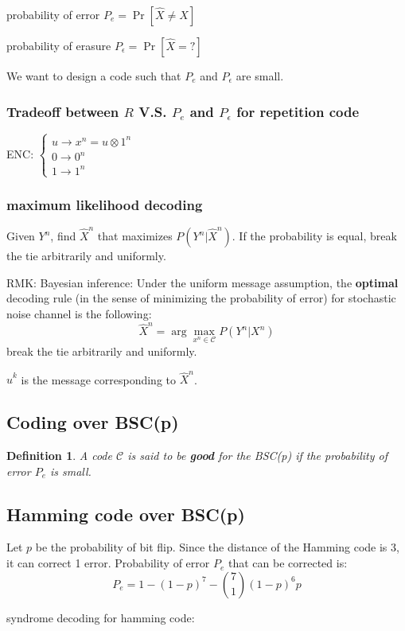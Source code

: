 \documentclass[letterpaper,12pt]{article}
\newtheorem{definition}{Definition}
\begin{document}
probability of error $P_e = \Pr[\hat{X}\neq X]$

probability of erasure $P_{\epsilon} = \Pr[\hat{X}=?]$

We want to design a code such that $P_e$ and $P_{\epsilon}$ are small.

\subsubsection{Tradeoff between $R$ V.S. $P_e$ and $P_{\epsilon}$ for repetition code}
ENC: $\begin{cases}
    u \to x^n = u\otimes 1^n \\
    0 \to 0^n \\
    1 \to 1^n
\end{cases}$

\subsubsection{maximum likelihood decoding}
Given $Y^n$, find $\hat{X}^n$ that maximizes $P(Y^n|\hat{X}^n)$. If the probability is equal, break the tie arbitrarily and uniformly.

RMK: Bayesian inference: Under the uniform message assumption, the \textbf{optimal} decoding rule (in the sense of minimizing the probability of error) for stochastic noise channel is the following: \[
    \hat{X}^n = \arg\max_{x^n\in\mathcal{C}}P(Y^n|X^n)
\]
break the tie arbitrarily and uniformly.

$\hat{u}^k$ is the message corresponding to $\hat{X}^n$.
\subsection{Coding over BSC(p)}
\begin{definition}
    A code $\mathcal{C}$ is said to be \textbf{good} for the BSC(p) if the probability of error $P_e$ is small.
\end{definition}
\subsection{Hamming code over BSC(p)}
Let $p$ be the probability of bit flip. Since the distance of the Hamming code is 3, it can correct 1 error. Probability of error $P_e$ that can be corrected is: \[
    P_e = 1-(1-p)^7 - \binom{7}{1}(1-p)^6p
\]

syndrome decoding for hamming code: 
\end{document}
